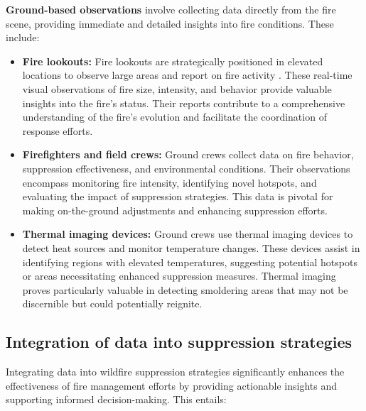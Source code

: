 \documentclass[
  12 pt,
]{Nemilov}
\begin{document}
\textbf{Ground-based observations} involve collecting data directly from the fire scene, providing immediate and detailed insights into fire conditions. These include:

\begin{itemize}
\item
  \textbf{Fire lookouts:} Fire lookouts are strategically positioned in elevated locations to observe large areas and report on fire activity \citep{berryoung2021little}. These real-time visual observations of fire size, intensity, and behavior provide valuable insights into the fire's status. Their reports contribute to a comprehensive understanding of the fire's evolution and facilitate the coordination of response efforts.
\item
  \textbf{Firefighters and field crews:} Ground crews collect data on fire behavior, suppression effectiveness, and environmental conditions. Their observations encompass monitoring fire intensity, identifying novel hotspots, and evaluating the impact of suppression strategies. This data is pivotal for making on-the-ground adjustments and enhancing suppression efforts.
\item
  \textbf{Thermal imaging devices:} Ground crews use thermal imaging devices to detect heat sources and monitor temperature changes. These devices assist in identifying regions with elevated temperatures, suggesting potential hotspots or areas necessitating enhanced suppression measures. Thermal imaging proves particularly valuable in detecting smoldering areas that may not be discernible but could potentially reignite.
\end{itemize}

\subsection{Integration of data into suppression strategies}\label{integration-of-data-into-suppression-strategies}

Integrating data into wildfire suppression strategies significantly enhances the effectiveness of fire management efforts by providing actionable insights and supporting informed decision-making. This entails:
\end{document}
